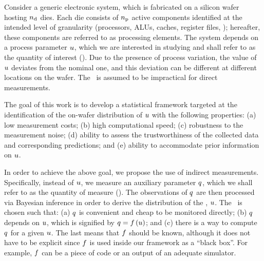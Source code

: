 Consider a generic electronic system, which is fabricated on a silicon wafer hosting ${n_\text{d}}$ dies.
Each die consists of ${n_\text{p}}$ active components identified at the intended level of granularity (processors, ALUs, caches, register files, \etc); hereafter, these components are referred to as processing elements.
The system depends on a process parameter $u$, which we are interested in studying and shall refer to as the quantity of interest (\qoi).
Due to the presence of process variation, the value of $u$ deviates from the nominal one, and this deviation can be different at different locations on the wafer.
The \qoi\ is assumed to be impractical for direct measurements.

The goal of this work is to develop a statistical framework targeted at the identification of the on-wafer distribution of $u$ with the following properties: (a) low measurement costs; (b) high computational speed; (c) robustness to the measurement noise; (d) ability to assess the trustworthiness of the collected data and corresponding predictions; and (e) ability to accommodate prior information on $u$.

In order to achieve the above goal, we propose the use of indirect measurements.
Specifically, instead of $u$, we measure an auxiliary parameter $q$, which we shall refer to as the quantity of measure (\qom).
The observations of $q$ are then processed via Bayesian inference in order to derive the distribution of the \qoi, $u$.
The \qom\ is chosen such that: (a) $q$ is convenient and cheap to be monitored directly; (b) $q$ depends on $u$, which is signified by $\q = \oBB{\u}$; and (c) there is a way to compute $q$ for a given $u$.
The last means that $\oBB$ should be known, although it does not have to be explicit since $\oBB$ is used inside our framework as a ``black box''.
For example, $\oBB$ can be a piece of code or an output of an adequate simulator.

